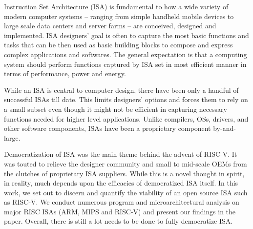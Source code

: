 

Instruction Set Architecture (ISA) is fundamental to how a wide variety of modern computer systems -- ranging from simple handheld mobile devices to large scale data centers and server farms -- are conceived, designed and implemented. ISA designers' goal is often to capture the most basic functions and tasks that can be then used as basic building blocks to compose and express complex applications and softwares. The general expectation is that a computing system should perform functions captured by ISA set in most efficient manner in terms of performance, power and energy. 

While an ISA is central to computer design, there have been only a handful of successful ISAs till date. This limits designers' options and forces them to rely on a small subset even though it might not be efficient in capturing necessary functions needed for higher level applications. Unlike compilers, OSs, drivers, and other software components, ISAs have been a proprietary component by-and-large.

Democratization of ISA was the main theme behind the advent of RISC-V. It was touted to relieve the designer community and small to mid-scale OEMs from the clutches of proprietary ISA suppliers. While this is a novel thought in spirit, in reality, much depends upon the efficacies of democratized ISA itself. In this work, we set out to discern and quantify the viability of an open source ISA such as RISC-V. We conduct numerous program and microarchitectural analysis on major RISC ISAs (ARM, MIPS and RISC-V) and present our findings in the paper. Overall, there is still a lot needs to be done to fully democratize ISA.  





